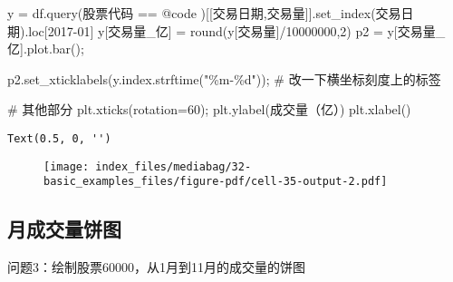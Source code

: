 \documentclass[
  letterpaper,
  DIV=11,
  numbers=noendperiod]{scrreprt}
\newenvironment{Shaded}{\begin{snugshade}}{\end{snugshade}}
\newcommand{\BuiltInTok}[1]{\textcolor[rgb]{0.00,0.23,0.31}{#1}}
\newcommand{\CommentTok}[1]{\textcolor[rgb]{0.37,0.37,0.37}{#1}}
\newcommand{\DecValTok}[1]{\textcolor[rgb]{0.68,0.00,0.00}{#1}}
\newcommand{\NormalTok}[1]{\textcolor[rgb]{0.00,0.23,0.31}{#1}}
\newcommand{\OperatorTok}[1]{\textcolor[rgb]{0.37,0.37,0.37}{#1}}
\newcommand{\SpecialCharTok}[1]{\textcolor[rgb]{0.37,0.37,0.37}{#1}}
\newcommand{\StringTok}[1]{\textcolor[rgb]{0.13,0.47,0.30}{#1}}
\begin{document}
\begin{Shaded}
\begin{Highlighting}[]
\NormalTok{y }\OperatorTok{=}\NormalTok{ df.query(}\StringTok{\textquotesingle{}股票代码 == @code \textquotesingle{}}\NormalTok{)[[}\StringTok{\textquotesingle{}交易日期\textquotesingle{}}\NormalTok{,}\StringTok{\textquotesingle{}交易量\textquotesingle{}}\NormalTok{]].set\_index(}\StringTok{\textquotesingle{}交易日期\textquotesingle{}}\NormalTok{).loc[}\StringTok{\textquotesingle{}2017{-}01\textquotesingle{}}\NormalTok{]}
\NormalTok{y[}\StringTok{\textquotesingle{}交易量\_亿\textquotesingle{}}\NormalTok{] }\OperatorTok{=} \BuiltInTok{round}\NormalTok{(y[}\StringTok{\textquotesingle{}交易量\textquotesingle{}}\NormalTok{]}\OperatorTok{/}\DecValTok{10000000}\NormalTok{,}\DecValTok{2}\NormalTok{)}
\NormalTok{p2 }\OperatorTok{=}\NormalTok{ y[}\StringTok{\textquotesingle{}交易量\_亿\textquotesingle{}}\NormalTok{].plot.bar()}\OperatorTok{;}

\NormalTok{p2.set\_xticklabels(y.index.strftime(}\StringTok{"\%m{-}}\SpecialCharTok{\%d}\StringTok{"}\NormalTok{))}\OperatorTok{;} \CommentTok{\# 改一下横坐标刻度上的标签}

\CommentTok{\# 其他部分}
\NormalTok{plt.xticks(rotation}\OperatorTok{=}\DecValTok{60}\NormalTok{)}\OperatorTok{;} 
\NormalTok{plt.ylabel(}\StringTok{\textquotesingle{}成交量（亿）\textquotesingle{}}\NormalTok{)}
\NormalTok{plt.xlabel(}\StringTok{\textquotesingle{}\textquotesingle{}}\NormalTok{)}
\end{Highlighting}
\end{Shaded}

\begin{verbatim}
Text(0.5, 0, '')
\end{verbatim}

\begin{figure}[H]

{\centering \texttt{[image: index\_files/mediabag/32-basic\_examples\_files/figure-pdf/cell-35-output-2.pdf]}

}

\end{figure}

\hypertarget{ux6708ux6210ux4ea4ux91cfux997cux56fe}{%
\subsection{月成交量饼图}\label{ux6708ux6210ux4ea4ux91cfux997cux56fe}}

问题3：绘制股票60000，从1月到11月的成交量的饼图
\end{document}
